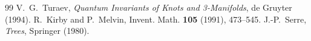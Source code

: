 \documentclass[11pt,a4paper]{amsart}
\begin{document}
\begin{thebibliography}{99}
 V.~G.~Turaev, \emph{Quantum Invariants of Knots and 3-Manifolds}, de Gruyter (1994).
 R.~Kirby and P.~Melvin, Invent. Math. \textbf{105} (1991), 473--545.
 J.-P.~Serre, \emph{Trees}, Springer (1980).
\end{thebibliography}
\end{document}
